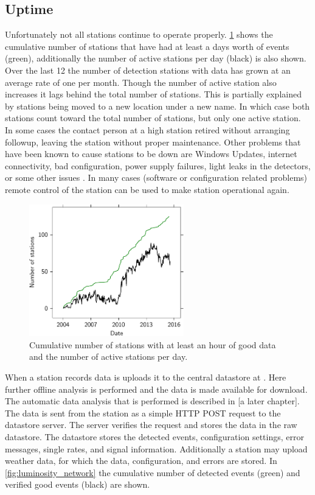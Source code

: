 \subsection{Uptime}

Unfortunately not all stations continue to operate properly. \cref{fig:active_stations} shows the cumulative number of stations that have had at least a days worth of events (green), additionally the number of active stations per day (black) is also shown. Over the last \SI{12}{\year} the number of detection stations with data has grown at an average rate of one per month. Though the number of active station also increases it lags behind the total number of stations. This is partially explained by stations being moved to a new location under a new name. In which case both stations count toward the total number of stations, but only one active station. In some cases the contact person at a high station retired without arranging followup, leaving the station without proper maintenance. Other problems that have been known to cause stations to be down are Windows Updates, internet connectivity, bad configuration, power supply failures, light leaks in the detectors, or some other issues \cite{delaat2013maintenance}. In many cases (software or configuration related problems) remote control of the station can be used to make station operational again.

\begin{figure}
    \centering
    \includegraphics[width=0.6\textwidth]
                    {plots/cluster/active_stations}
    \caption{Cumulative number of stations with at least an hour of good data and the number of active stations per day.}
    \label{fig:active_stations}
\end{figure}

When a station records data is uploads it to the central datastore at \nikhef. Here further offline analysis is performed and the data is made available for download. The automatic data analysis that is performed is described in [a later chapter]. The data is sent from the station as a simple HTTP POST request to the datastore server. The server verifies the request and stores the data in the raw datastore. The datastore stores the detected events, configuration settings, error messages, single rates, and \gps signal information. Additionally a station may upload weather data, for which the data, configuration, and errors are stored. In \cref{fig:luminosity_network} the cumulative number of detected events (green) and verified good events (black) are shown.

